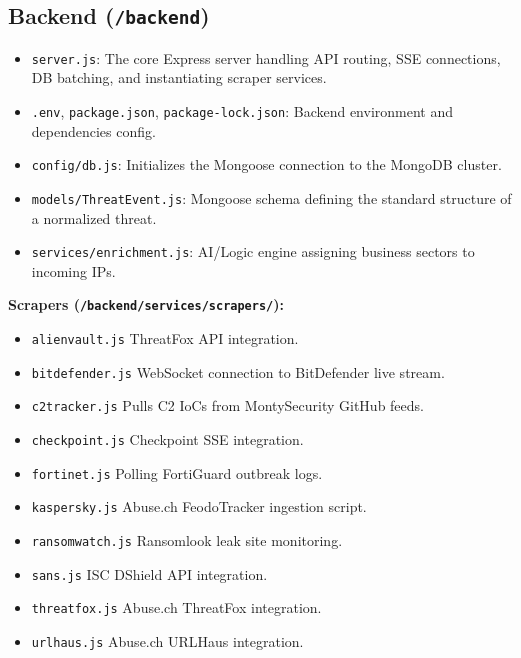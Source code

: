 \documentclass[12pt,a4paper]{article}
\begin{document}
\subsection{Backend (\texttt{/backend})}
\begin{itemize}[noitemsep]
    \item \verb|server.js|: The core Express server handling API routing, SSE connections, DB batching, and instantiating scraper services.
    \item \verb|.env|, \verb|package.json|, \verb|package-lock.json|: Backend environment and dependencies config.
    \item \verb|config/db.js|: Initializes the Mongoose connection to the MongoDB cluster.
    \item \verb|models/ThreatEvent.js|: Mongoose schema defining the standard structure of a normalized threat.
    \item \verb|services/enrichment.js|: AI/Logic engine assigning business sectors to incoming IPs.
\end{itemize}
\textbf{Scrapers (\texttt{/backend/services/scrapers/}):}
\begin{itemize}[noitemsep]
    \item \verb|alienvault.js| \textemdash{} ThreatFox API integration.
    \item \verb|bitdefender.js| \textemdash{} WebSocket connection to BitDefender live stream.
    \item \verb|c2tracker.js| \textemdash{} Pulls C2 IoCs from MontySecurity GitHub feeds.
    \item \verb|checkpoint.js| \textemdash{} Checkpoint SSE integration.
    \item \verb|fortinet.js| \textemdash{} Polling FortiGuard outbreak logs.
    \item \verb|kaspersky.js| \textemdash{} Abuse.ch FeodoTracker ingestion script.
    \item \verb|ransomwatch.js| \textemdash{} Ransomlook leak site monitoring.
    \item \verb|sans.js| \textemdash{} ISC DShield API integration.
    \item \verb|threatfox.js| \textemdash{} Abuse.ch ThreatFox integration.
    \item \verb|urlhaus.js| \textemdash{} Abuse.ch URLHaus integration.
\end{itemize}
\end{document}
